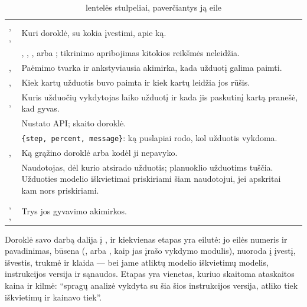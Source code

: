 \begin{table}[H]
\caption{ lentelės stulpeliai, paverčiantys ją eile}\label{tab:arch:jobrow}
\begin{tabularx}{\textwidth}{@{}L{37mm}Y@{}}
\toprule
{} &  \\
\midrule
{}, ,  & Kuri doroklė, su kokia įvestimi, apie ką. \\
 & , , ,  arba ; tikrinimo apribojimas kitokios reikšmės neleidžia. \\
,  & Paėmimo tvarka ir ankstyviausia akimirka, kada užduotį galima paimti. \\
,  & Kiek kartų užduotis buvo paimta ir kiek kartų leidžia jos rūšis. \\
,  & Kuris užduočių vykdytojas laiko užduotį ir kada jis paskutinį kartą pranešė, kad gyvas. \\
 & Nustato API; skaito doroklė. \\
 & \texttt{\{step, percent, message\}}: ką puslapiai rodo, kol užduotis vykdoma. \\
,  & Ką grąžino doroklė arba kodėl ji nepavyko. \\
 & Naudotojas, dėl kurio atsirado užduotis; planuoklio užduotims tuščia. Užduoties modelio iškvietimai priskiriami šiam naudotojui, jei apskritai kam nors priskiriami. \\
, ,  & Trys jos gyvavimo akimirkos. \\
\bottomrule
\end{tabularx}
\end{table}

Doroklė savo darbą dalija į , ir kiekvienas etapas yra  eilutė:
jo eilės numeris ir pavadinimas, būsena (,  arba , kaip
jas įrašo vykdymo modulis), nuoroda į įvestį, išvestis, trukmė ir klaida --- bei jame atliktų
modelio iškvietimų modelis, instrukcijos versija ir sąnaudos. Etapas yra vienetas, kuriuo
skaitoma ataskaitos kaina ir kilmė: \enquote{spragų analizė vykdyta su šia šios instrukcijos
versija, atliko tiek iškvietimų ir kainavo tiek}.

